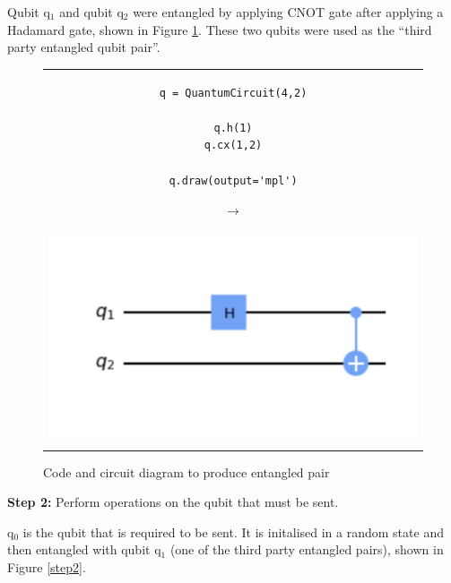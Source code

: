 Qubit q$_1$ and qubit q$_2$ were entangled by applying CNOT gate after applying a Hadamard gate, shown in Figure \ref{step1}. These two qubits were used as the ``third party entangled qubit pair''.
\begin{figure}[H]
\centering
\begin{tabular}{c}
\begin{minipage}[c]{.45\linewidth}
\begin{verbatim}
q = QuantumCircuit(4,2)

q.h(1)
q.cx(1,2)

q.draw(output='mpl')
\end{verbatim}
\end{minipage}
\begin{minipage}[c]{.1\linewidth}
\centering
$\rightarrow$
\end{minipage}
\begin{minipage}[c]{.4\linewidth}
\centering
\includegraphics[width=\textwidth]{lab3/images/Step1.png}
\end{minipage}\\
\\ 
\end{tabular}
\captionsetup{font = it, labelfont = bf, width=.91\linewidth, justification=centering}
\caption{Code and circuit diagram to produce entangled pair}
\label{step1}
\end{figure}

\textbf{Step 2:} Perform operations on the qubit that must be sent.

q$_0$ is the qubit that is required to be sent. It is initalised in a random state and then entangled with qubit q$_1$ (one of the third party entangled pairs), shown in Figure \ref{step2}. 

